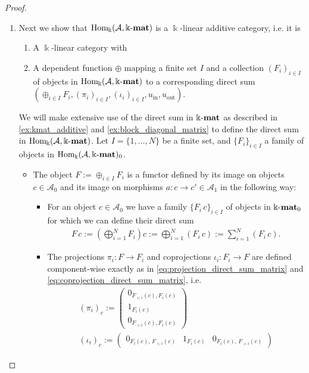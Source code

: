 \begin{proof}
\begin{enumerate}
\item Next we show that $\mathrm{Hom_{\Bbbk}}(\mathcal{A},\Bbbk\textnormal{-}\mathbf{mat})$ is a $\Bbbk$-linear additive category, i.e. it is
\begin{enumerate}
\renewcommand{\labelenumii}{(\roman{enumii})}
\item A $\Bbbk$-linear category with
\item A dependent function $\oplus$ mapping a finite set $I$ and a collection $(F_{i})_{i\in I}$ of objects in $\mathrm{Hom_{\Bbbk}}(\mathcal{A},\Bbbk\textnormal{-}\mathbf{mat})$
to a corresponding direct sum $( \oplus_{i\in I} F_{i}, (\pi_{i})_{i\in I}, (\iota_{i})_{i\in I}, u_{\mathrm{in}}, u_{\mathrm{out}} )$.
\end{enumerate}
\begin{subproof}[Proof of (ii)]
We will make extensive use of the direct sum in $\Bbbk\textnormal{-}\mathbf{mat}$ as described in \ref{ex:kmat_additive} and \ref{ex:block_diagonal_matrix} to
define the direct sum in $\mathrm{Hom_{\Bbbk}}(\mathcal{A},\Bbbk\textnormal{-}\mathbf{mat})$.
Let $I = \{1,\dots,N\}$ be a finite set, and $\{F_{i} \}_{i \in I}$ a family of objects in $\mathrm{Hom_{\Bbbk}}(\mathcal{A},\Bbbk\textnormal{-}\mathbf{mat})_{0}$.
\begin{itemize}
\item The object $F := \oplus_{i \in I} F_{i}$ is a functor defined by its image on objects $c \in \mathcal{A}_{0}$ and its
image on morphisms $a : c \rightarrow c' \in \mathcal{A}_{1}$ in the following way:
\begin{itemize}
\item For an object $c \in \mathcal{A}_{0}$ we have a family $\{F_{i}\,c \}_{i \in I}$ of objects in $\Bbbk\textnormal{-}\mathbf{mat}_{0}$ for which we can define
their direct sum
\begin{align}
F\,c := \left(\bigoplus_{i = 1}^{N} F_{i}\right)c := \bigoplus_{i = 1}^{N} (F_{i}\,c) := \sum_{i = 1}^{N} (F_{i}\,c).
\end{align}
\item The projections $\pi_{i} : F \rightarrow F_{i}$ and coprojections $\iota_{i} : F_{i} \rightarrow F$ are defined component-wise
exactly as in \eqref{eq:projection_direct_sum_matrix} and \eqref{eq:coprojection_direct_sum_matrix}, i.e.
\begin{align}
(\pi_{i})_{c} :=
\begin{pmatrix}
0_{F_{<i}(c), F_{i}(c)} \\[2pt]
1_{F_{i}(c)} \\[2pt]
0_{F_{>i}(c), F_{i}(c)}
\end{pmatrix} \\[1ex]
(\iota_{i})_{c} := 
\begin{pmatrix}
0_{F_{i}(c),\,F_{<i}(c)} & 1_{F_{i}(c)} & 0_{F_{i}(c),\,F_{>i}(c)}
\end{pmatrix}
\end{align}


\end{itemize}
\end{itemize}
\end{subproof}
\end{enumerate}
\end{proof}
